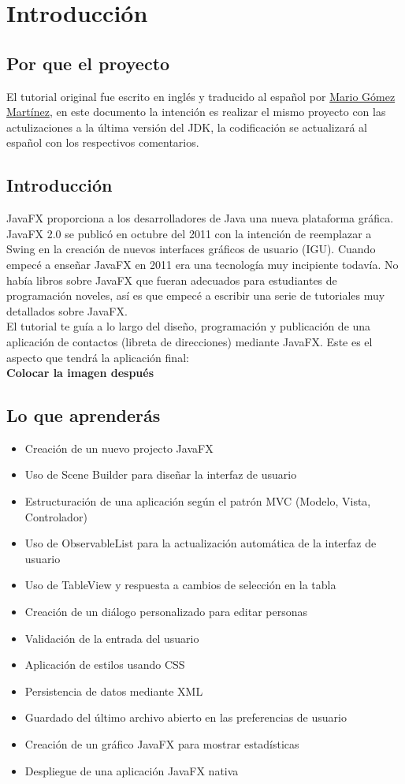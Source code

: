 \chapter*{Introducción}
\section*{Por que el proyecto}
El tutorial original fue escrito en inglés y traducido al español por \textcolor{azul}{\href{https://about.me/magomar}{Mario Gómez Martínez}}, en este documento la intención es realizar el mismo proyecto con las actulizaciones a la última versión del JDK, la codificación se actualizará al español con los respectivos comentarios. 
\section*{Introducción}
JavaFX proporciona a los desarrolladores de Java una nueva plataforma gráfica. JavaFX 2.0 se publicó en octubre del 2011 con la intención de reemplazar a Swing en la creación de nuevos interfaces gráficos de usuario (IGU). Cuando empecé a enseñar JavaFX en 2011 era una tecnología muy incipiente todavía. No había libros sobre JavaFX que fueran adecuados para estudiantes de programación noveles, así es que empecé a escribir una serie de tutoriales muy detallados sobre JavaFX.\\
El tutorial te guía a lo largo del diseño, programación y publicación de una aplicación de contactos (libreta de direcciones) mediante JavaFX. Este es el aspecto que tendrá la aplicación final:\\
\textbf{Colocar la imagen después}\\
\section*{Lo que aprenderás}
\begin{itemize}
	\item Creación de un nuevo projecto JavaFX
	\item Uso de Scene Builder para diseñar la interfaz de usuario
	\item Estructuración de una aplicación según el patrón MVC (Modelo, Vista, Controlador)
	\item Uso de ObservableList para la actualización automática de la interfaz de usuario
	\item Uso de TableView y respuesta a cambios de selección en la tabla
	\item Creación de un diálogo personalizado para editar personas
	\item Validación de la entrada del usuario
	\item Aplicación de estilos usando CSS
	\item Persistencia de datos mediante XML
	\item Guardado del último archivo abierto en las preferencias de usuario
	\item Creación de un gráfico JavaFX para mostrar estadísticas
	\item Despliegue de una aplicación JavaFX nativa
\end{itemize}

